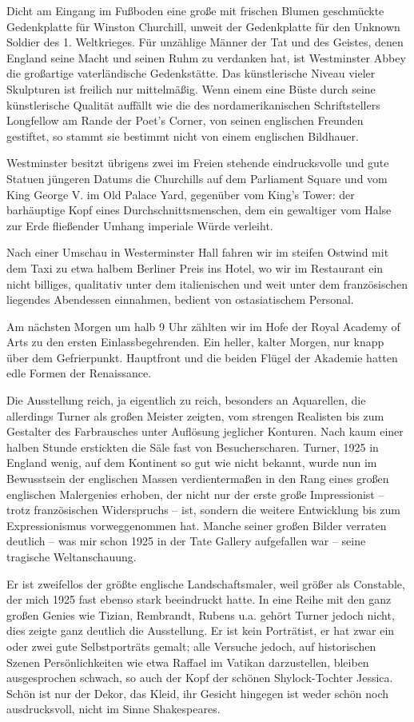 Dicht am Eingang im Fußboden eine große mit frischen Blumen geschmückte Gedenkplatte für Winston Churchill, unweit der Gedenkplatte für den Unknown Soldier des 1. Weltkrieges. Für unzählige Männer der Tat und des Geistes, denen England seine Macht und seinen Ruhm zu verdanken hat, ist Westminster Abbey die großartige vaterländische Gedenkstätte. Das künstlerische Niveau vieler Skulpturen ist freilich nur mittelmäßig. Wenn einem eine Büste durch seine künstlerische Qualität auffällt wie die des nordamerikanischen Schriftstellers Longfellow am Rande der Poet's Corner, von seinen englischen Freunden gestiftet, so stammt sie bestimmt nicht von einem englischen Bildhauer.

Westminster besitzt übrigens zwei im Freien stehende eindrucksvolle und gute Statuen jüngeren Datums die Churchills auf dem Parliament Square und vom King George V. im Old Palace Yard, gegenüber vom King's Tower: der barhäuptige Kopf eines Durchschnittsmenschen, dem ein gewaltiger vom Halse zur Erde fließender Umhang imperiale Würde verleiht.

Nach einer Umschau in Westerminster Hall fahren wir im steifen Ostwind mit dem Taxi zu etwa halbem Berliner Preis ins Hotel, wo wir im Restaurant ein nicht billiges, qualitativ unter dem italienischen und weit unter dem französischen liegendes Abendessen einnahmen, bedient von ostasiatischem Personal.

Am nächsten Morgen um halb 9 Uhr zählten wir im Hofe der Royal Academy of Arts zu den ersten Einlassbegehrenden. Ein heller, kalter Morgen, nur knapp über dem Gefrierpunkt. Hauptfront und die beiden Flügel der Akademie hatten edle Formen der Renaissance.

Die Ausstellung reich, ja eigentlich zu reich, besonders an Aquarellen, die allerdings Turner als großen Meister zeigten, vom strengen Realisten bis zum Gestalter des Farbrausches unter Auflösung jeglicher Konturen. Nach kaum einer halben Stunde erstickten die Säle fast von Besucherscharen. Turner, 1925 in England wenig, auf dem Kontinent so gut wie nicht bekannt, wurde nun im Bewusstsein der englischen Massen verdientermaßen in den Rang eines großen englischen Malergenies erhoben, der nicht nur der erste große Impressionist -- trotz französischen Widerspruchs -- ist, sondern die weitere Entwicklung bis zum Expressionismus vorweggenommen hat. Manche seiner großen Bilder verraten deutlich -- was mir schon 1925 in der Tate Gallery aufgefallen war -- seine tragische Weltanschauung.

Er ist zweifellos der größte englische Landschaftsmaler, weil größer als Constable, der mich 1925 fast ebenso stark beeindruckt hatte. In eine Reihe mit den ganz großen Genies wie Tizian, Rembrandt, Rubens u.a. gehört Turner jedoch nicht, dies zeigte ganz deutlich die Ausstellung. Er ist kein Porträtist, er hat zwar ein oder zwei gute Selbstporträts gemalt; alle Versuche jedoch, auf historischen Szenen Persönlichkeiten wie etwa Raffael im Vatikan darzustellen, bleiben ausgesprochen schwach, so auch der Kopf der schönen Shylock-Tochter Jessica. Schön ist nur der Dekor, das Kleid, ihr Gesicht hingegen ist weder schön noch ausdrucksvoll, nicht im Sinne Shakespeares.

